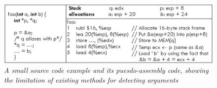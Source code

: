 \begin{figure}[t]
{
\vspace{-6ex}
\centering
\includegraphics[width=\linewidth]{figures/EPS/abstract-stack-diff.eps}
\caption{\textit{A small source code example and its puesdo-assembly code, showing the limitation of existing methods for detecting arguments}}
\label{fig:abs-stack-diff}
\vspace{-4ex}
}
\vspace{-4ex}
\end{figure}
